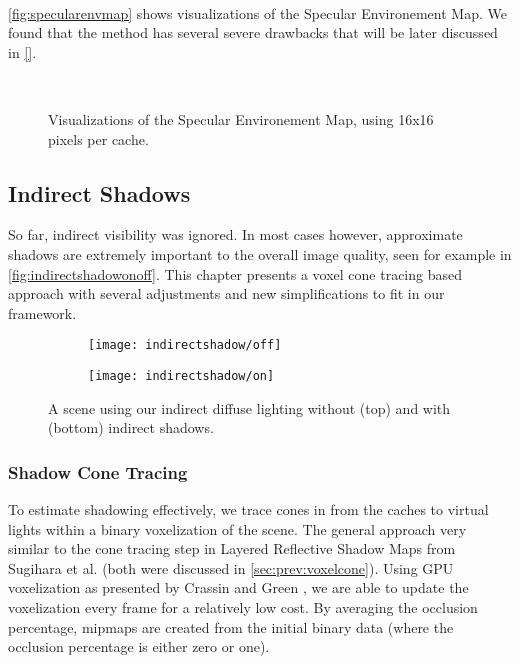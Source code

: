 \documentclass[thesis.tex]{subfiles}
\begin{document}
\\
\autoref{fig:specularenvmap} shows visualizations of the Specular Environement Map.
We found that the method has several severe drawbacks that will be later discussed in \autoref{}. 
\begin{figure}[h!]
\centering
{}
\\
\caption{Visualizations of the Specular Environement Map, using 16x16 pixels per cache.}
\label{fig:specularenvmap}
\end{figure}

\subsection{Indirect Shadows}
So far, indirect visibility was ignored.
In most cases however, approximate shadows are extremely important to the overall image quality, seen for example in \autoref{fig:indirectshadowonoff}.
This chapter presents a voxel cone tracing based approach with several adjustments and new simplifications to fit in our framework.
\begin{figure}[h!]
\centering
\begin{subfigure}[b]{\textwidth}
	\texttt{[image: indirectshadow/off]}
\end{subfigure}

\vspace{8pt}
\begin{subfigure}[b]{\textwidth}
	\texttt{[image: indirectshadow/on]}
\end{subfigure}
\caption{A scene using our indirect diffuse lighting without (top) and with (bottom) indirect shadows.}
\label{fig:indirectshadowonoff}
\end{figure}

\subsubsection{Shadow Cone Tracing}\label{sec:impl:voxelization}
To estimate shadowing effectively, we trace cones in from the caches to virtual lights within a binary voxelization of the scene.
The general approach very similar to the cone tracing step in \cite{bib:layeredrsm} Layered Reflective Shadow Maps from Sugihara et al. \cite{bib:layeredrsm} (both were discussed in \autoref{sec:prev:voxelcone}).
Using GPU voxelization as presented by Crassin and Green \cite{bib:openglinsightsvoxel}, we are able to update the voxelization every frame for a relatively low cost.
By averaging the occlusion percentage, mipmaps are created from the initial binary data (where the occlusion percentage is either zero or one).
\end{document}

